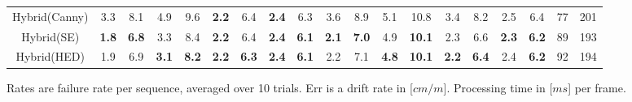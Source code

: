 \begin{table}
\begin{tabular}{c|cccccccc|cccccccc|cc}
Hybrid(Canny\cite{canny1987computational}) 	&  3.3   & 8.1    & 4.9    &  9.6  &  \textbf{2.2}  & 6.4  &  \textbf{2.4}   &  6.3   & 3.6  &  8.9  & 5.1    & 10.8   & 3.4 & 8.2 & 2.5 &  6.4& 77 & 201\\ 
Hybrid(SE\cite{dollar2013structured}) 				&  \textbf{1.8}    & \textbf{6.8}   & 3.3    &  8.4   &  \textbf{2.2}  & 6.4   &  \textbf{2.4}   &  \textbf{6.1}   &  \textbf{2.1}   &  \textbf{7.0}   & 4.9    &  \textbf{10.1}   & 2.3 & 6.6 &  \textbf{2.3} & \textbf{6.2} & 89 & 193\\ 
Hybrid(HED\cite{xie2015holistically}) 				&  1.9    & 6.9    &  \textbf{3.1}    &   \textbf{8.2}   &  \textbf{2.2}  &  \textbf{6.3}   &  \textbf{2.4}   &   \textbf{6.1}   & 2.2   & 7.1  &  \textbf{4.8}    & \textbf{10.1}    &  \textbf{2.2} &  \textbf{6.4} &  2.4 &  \textbf{6.2} &  92 & 194\\ \hline
	\end{tabular}
	{\footnotesize * Rates are failure rate per sequence, averaged over 10 trials. Err is a drift rate in [$cm/m$]. Processing time in [$ms$] per frame.}
\end{table}
 
